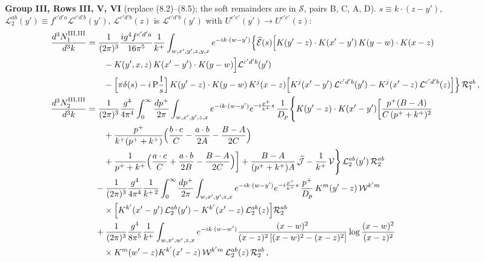 \documentclass[10pt]{article}
\begin{document}
\noindent\textbf{Group III, Rows III, V, VI} (replace (8.2)--(8.5); the soft remainders are in $\mathcal{S}$, pairs B, C, A, D). $s\equiv k\cdot(z-y')$, $\mathcal{L}_{2}^{ab}(y')\equiv f^{c'd'a}\mathcal{L}^{c'd'b}(y')$, $\mathcal{L}^{c'd'b}(z)$ is $\mathcal{L}^{c'd'b}(y')$ with $U^{c'e'}(y')\to U^{c'e'}(z)$:
\begin{align}
\frac{d^{3}N^{\rm III,III}_{1}}{d^{3}k}&=\frac{1}{(2\pi)^{3}}\frac{ig^{4}f^{c'd'a}}{16\pi^{5}}\frac{1}{k^{+}}\int_{w,x',y',z,y,x}e^{-ik\cdot(w-y')}\Big\{\widehat{\mathcal{E}}(s)\Big[K(y'-z)\cdot K(x'-y')\,K(y-w)\cdot K(x-z)\notag\\&\qquad-K(y',x,z)\,K(x'-y')\cdot K(y-w)\Big]\mathcal{L}^{c'd'b}(y')\notag\\
&\qquad-\Big[\pi\delta(s)-i\,{\rm P}\frac1s\Big]\,K(y'-z)\cdot K(y-w)\,K^{j}(x-z)\Big[K^{j}(x'-y')\,\mathcal{L}^{c'd'b}(y')-K^{j}(x'-z)\,\mathcal{L}^{c'd'b}(z)\Big]\Big\}\,\mathcal{R}_{1}^{ab}\,,\label{sf:G3R31}\\
\frac{d^{3}N^{\rm III,III}_{2}}{d^{3}k}&=\frac{1}{(2\pi)^{3}}\frac{g^{4}}{4\pi^{4}}\int_{0}^{\infty}\frac{dp^{+}}{2\pi}\int_{w,x',y',z,x}e^{-ik\cdot(w-y')}e^{-i\frac{p^{+}}{k^{+}}s}\,\frac{1}{D_{p}}\Bigg\{K(y'-z)\cdot K(x'-y')\bigg[\frac{p^{+}(B-A)}{C\,(p^{+}+k^{+})^{2}}\notag\\&\qquad+\frac{p^{+}}{k^{+}(p^{+}+k^{+})}\Big(\frac{b\cdot c}{C}-\frac{a\cdot b}{2A}-\frac{B-A}{2C}\Big)\notag\\
&\qquad+\frac{1}{p^{+}+k^{+}}\Big(\frac{a\cdot c}{C}+\frac{a\cdot b}{2B}-\frac{B-A}{2C}\Big)\bigg]+\frac{B-A}{(p^{+}+k^{+})A}\,\widehat{\mathcal{J}}-\frac{1}{k^{+}}\,\mathcal{V}\Bigg\}\,\mathcal{L}_{2}^{ab}(y')\,\mathcal{R}_{2}^{ab}\notag\\
&\quad-\frac{1}{(2\pi)^{3}}\frac{g^{4}}{4\pi^{4}}\frac{1}{k^{+\,2}}\int_{0}^{\infty}\frac{dp^{+}}{2\pi}\int_{w,x',y',z,x}e^{-ik\cdot(w-y')}e^{-i\frac{p^{+}}{k^{+}}s}\,\frac{p^{+}}{D_{p}}\,K^{m}(y'-z)\,\mathcal{W}^{k'm}\notag\\&\qquad\times\Big[K^{k'}(x'-y')\,\mathcal{L}_{2}^{ab}(y')-K^{k'}(x'-z)\,\mathcal{L}_{2}^{ab}(z)\Big]\mathcal{R}_{2}^{ab}\notag\\
&\quad+\frac{1}{(2\pi)^{3}}\frac{g^{4}}{8\pi^{5}}\frac{1}{k^{+}}\int_{w,x',w',z,x}e^{-ik\cdot(w-w')}\frac{(x-w)^{2}}{(x-z)^{2}\left[(x-w)^{2}-(x-z)^{2}\right]}\log\frac{(x-w)^{2}}{(x-z)^{2}}\notag\\&\qquad\times K^{m}(w'-z)K^{k'}(x'-z)\,\mathcal{W}^{k'm}\,\mathcal{L}_{2}^{ab}(z)\,\mathcal{R}_{2}^{ab}\,,\label{sf:G3R32}
\end{align}
\end{document}
